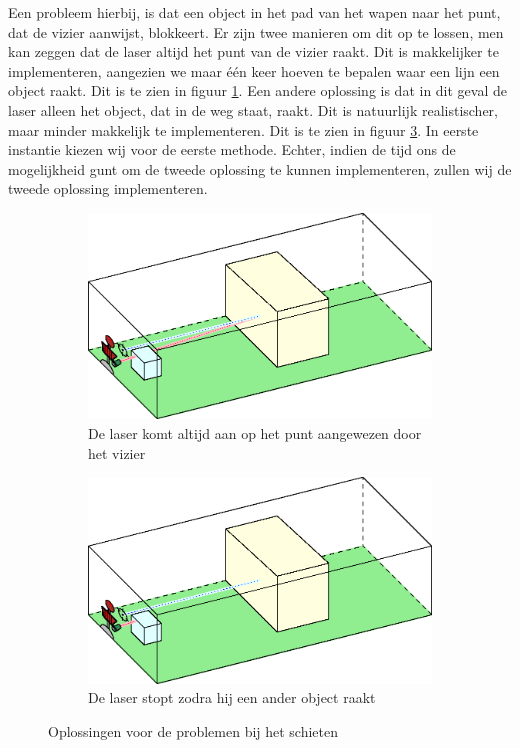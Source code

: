 Een probleem hierbij, is dat een object in het pad van het wapen naar het punt, dat de vizier aanwijst, blokkeert. Er zijn twee manieren om dit op te lossen, men kan zeggen dat de laser altijd het punt van de vizier raakt. Dit is makkelijker te implementeren, aangezien we maar \'e\'en keer hoeven te bepalen waar een lijn een object raakt. Dit is te zien in figuur \ref{fig:COL2}. Een andere oplossing is dat in dit geval de laser alleen het object, dat in de weg staat, raakt. Dit is natuurlijk realistischer, maar minder makkelijk te implementeren. Dit is te zien in figuur \ref{fig:COL3}. In eerste instantie kiezen wij voor de eerste methode. Echter, indien de tijd ons de mogelijkheid gunt om de tweede oplossing te kunnen implementeren, zullen wij de tweede oplossing implementeren.
\FloatBarrier
\begin{figure}[h]
\begin{subfigure}{0.5\textwidth}
\centering
\includegraphics[width=\textwidth]{Graphics/Collision2.eps}
\caption{De laser komt altijd aan op het punt aangewezen door het vizier}
\label{fig:COL2}
\end{subfigure}
\begin{subfigure}{0.5\textwidth}
\centering
\includegraphics[width=\textwidth]{Graphics/Collision3.eps}
\caption{De laser stopt zodra hij een ander object raakt}
\label{fig:COL3}
\end{subfigure}
\caption{Oplossingen voor de problemen bij het schieten}
\end{figure}
\FloatBarrier

